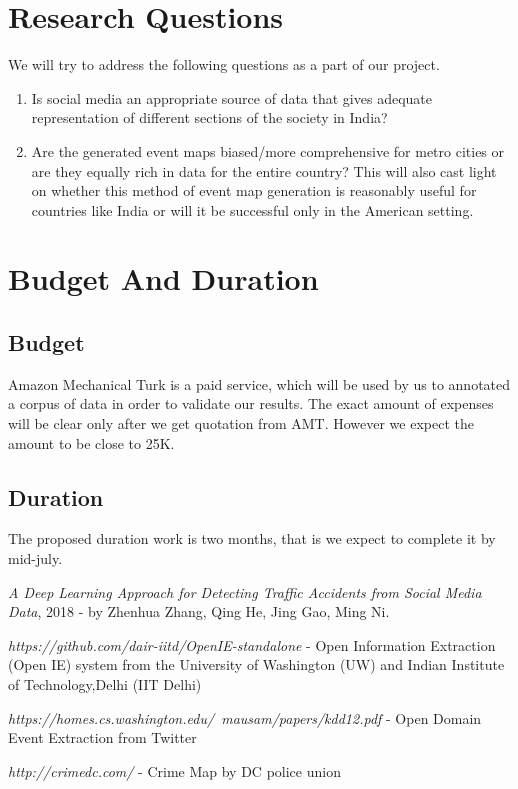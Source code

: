 \documentclass[a4paper,11pt]{article}
\begin{document}
\section{Research Questions}

We will try to address the following questions as a part of our project.
\begin{enumerate}
    \item Is social media an appropriate source of data that gives adequate representation of different sections of the society in India?
    
    \item Are the generated  event maps biased/more comprehensive for metro cities or are they equally rich in data for the entire country? This will also cast light on whether this method of event map generation is reasonably useful for countries like India or will it be successful only in the American setting.
\end{enumerate}

\section{Budget And Duration}
\subsection{Budget}
Amazon Mechanical Turk is a paid service, which will be used by us to annotated a corpus of data in order to validate our results. The exact amount of expenses will be clear only after we get quotation from AMT. However we expect the amount to be close to 25K.



\subsection{Duration}
The proposed duration work is two months, that is we expect to complete it by mid-july.   

\newpage
\begin{thebibliography}{1}

   {\em A Deep Learning Approach for Detecting Traffic Accidents from Social Media Data}, 2018 - by Zhenhua Zhang, Qing He, Jing Gao, Ming Ni.

     {\em https://github.com/dair-iitd/OpenIE-standalone} - Open Information Extraction (Open IE) system from the University of Washington (UW) and Indian Institute of Technology,Delhi (IIT Delhi)

     {\em https://homes.cs.washington.edu/~mausam/papers/kdd12.pdf} - Open Domain Event Extraction from Twitter

    {\em http://crimedc.com/} - Crime Map by DC police union

\end{thebibliography}
\end{document}

